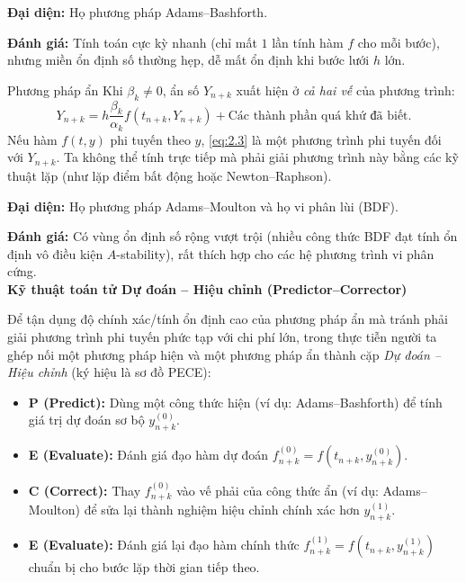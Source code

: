 \textbf{Đại diện:} Họ phương pháp Adams--Bashforth. 

\textbf{Đánh giá:} Tính toán cực kỳ nhanh (chỉ mất $1$ lần tính hàm $f$ cho mỗi bước), nhưng miền ổn định số thường hẹp, dễ mất ổn định khi bước lưới $h$ lớn.
    
    \begin{baitapbox}{Phương pháp ẩn} 
        Khi $\beta_k \neq 0$, ẩn số $Y_{n+k}$ xuất hiện ở \textit{cả hai vế} của phương trình:
    \begin{equation*}
        Y_{n+k} = h \frac{\beta_k}{\alpha_k} f(t_{n+k}, Y_{n+k}) + \text{Các thành phần quá khứ đã biết}.
    \end{equation*}
    \noindent Nếu hàm $f(t, y)$ phi tuyến theo $y$, \eqref{eq:2.3} là một phương trình phi tuyến đối với $Y_{n+k}$. Ta không thể tính trực tiếp mà phải giải phương trình này bằng các kỹ thuật lặp (như lặp điểm bất động hoặc Newton--Raphson). \\
    \end{baitapbox}

\textbf{Đại diện:} Họ phương pháp Adams--Moulton và họ vi phân lùi (BDF). 

\textbf{Đánh giá:} Có vùng ổn định số rộng vượt trội (nhiều công thức BDF đạt tính ổn định vô điều kiện $A$-stability), rất thích hợp cho các hệ phương trình vi phân cứng.\\

\textbf{Kỹ thuật toán tử Dự đoán -- Hiệu chỉnh (Predictor--Corrector)} 

Để tận dụng độ chính xác/tính ổn định cao của phương pháp ẩn mà tránh phải giải phương trình phi tuyến phức tạp với chi phí lớn, trong thực tiễn người ta ghép nối một phương pháp hiện và một phương pháp ẩn thành cặp \textit{Dự đoán -- Hiệu chỉnh} (ký hiệu là sơ đồ PECE):
\begin{itemize}
    \item \textbf{P (Predict):} Dùng một công thức hiện (ví dụ: Adams--Bashforth) để tính giá trị dự đoán sơ bộ $y_{n+k}^{(0)}$.
    \item \textbf{E (Evaluate):} Đánh giá đạo hàm dự đoán $f_{n+k}^{(0)} = f\left(t_{n+k}, y_{n+k}^{(0)}\right)$.
    \item \textbf{C (Correct):} Thay $f_{n+k}^{(0)}$ vào vế phải của công thức ẩn (ví dụ: Adams--Moulton) để sửa lại thành nghiệm hiệu chỉnh chính xác hơn $y_{n+k}^{(1)}$.
    \item \textbf{E (Evaluate):} Đánh giá lại đạo hàm chính thức $f_{n+k}^{(1)} = f\left(t_{n+k}, y_{n+k}^{(1)}\right)$ chuẩn bị cho bước lặp thời gian tiếp theo.
\end{itemize}

